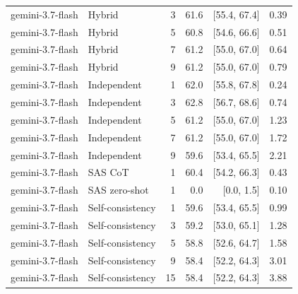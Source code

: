 \begin{tabular}{@{}llrrrr@{}}
gemini-3.7-flash & Hybrid & 3 & 61.6 & [55.4, 67.4] & 0.39 \\
gemini-3.7-flash & Hybrid & 5 & 60.8 & [54.6, 66.6] & 0.51 \\
gemini-3.7-flash & Hybrid & 7 & 61.2 & [55.0, 67.0] & 0.64 \\
gemini-3.7-flash & Hybrid & 9 & 61.2 & [55.0, 67.0] & 0.79 \\
gemini-3.7-flash & Independent & 1 & 62.0 & [55.8, 67.8] & 0.24 \\
gemini-3.7-flash & Independent & 3 & 62.8 & [56.7, 68.6] & 0.74 \\
gemini-3.7-flash & Independent & 5 & 61.2 & [55.0, 67.0] & 1.23 \\
gemini-3.7-flash & Independent & 7 & 61.2 & [55.0, 67.0] & 1.72 \\
gemini-3.7-flash & Independent & 9 & 59.6 & [53.4, 65.5] & 2.21 \\
gemini-3.7-flash & SAS CoT & 1 & 60.4 & [54.2, 66.3] & 0.43 \\
gemini-3.7-flash & SAS zero-shot & 1 & 0.0 & [0.0, 1.5] & 0.10 \\
gemini-3.7-flash & Self-consistency & 1 & 59.6 & [53.4, 65.5] & 0.99 \\
gemini-3.7-flash & Self-consistency & 3 & 59.2 & [53.0, 65.1] & 1.28 \\
gemini-3.7-flash & Self-consistency & 5 & 58.8 & [52.6, 64.7] & 1.58 \\
gemini-3.7-flash & Self-consistency & 9 & 58.4 & [52.2, 64.3] & 3.01 \\
gemini-3.7-flash & Self-consistency & 15 & 58.4 & [52.2, 64.3] & 3.88 \\
\midrule
\bottomrule
\end{tabular}